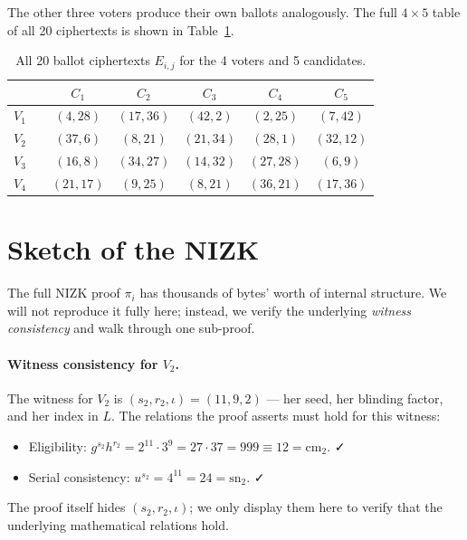 \documentclass[12pt,a4paper,oneside]{report}
\begin{document}
The other three voters produce their own ballots analogously. The full 
$4 \times 5$ table of all 20 ciphertexts is shown in 
Table~\ref{tab:byhand-all-ciphertexts}.

\begin{table}[H]
\centering
\caption{All 20 ballot ciphertexts $E_{i, j}$ for the 4 voters and 5 candidates.}
\label{tab:byhand-all-ciphertexts}
\small
\begin{tabular}{ccccccc}
\toprule
& & $C_1$ & $C_2$ & $C_3$ & $C_4$ & $C_5$ \\
\midrule
$V_1$ & & $(4, 28)$ & $(17, 36)$ & $(42, 2)$ & $(2, 25)$ & $(7, 42)$ \\
$V_2$ & & $(37, 6)$ & $(8, 21)$ & $(21, 34)$ & $(28, 1)$ & $(32, 12)$ \\
$V_3$ & & $(16, 8)$ & $(34, 27)$ & $(14, 32)$ & $(27, 28)$ & $(6, 9)$ \\
$V_4$ & & $(21, 17)$ & $(9, 25)$ & $(8, 21)$ & $(36, 21)$ & $(17, 36)$ \\
\bottomrule
\end{tabular}
\end{table}

\section{Sketch of the NIZK}
\label{sec:byhand-nizk}

The full NIZK proof $\pi_i$ has thousands of bytes' worth of internal 
structure. We will not reproduce it fully here; instead, we verify the 
underlying \textit{witness consistency} and walk through one sub-proof.

\paragraph{Witness consistency for $V_2$.} 
The witness for $V_2$ is $(s_2, r_2, \iota) = (11, 9, 2)$ --- her seed, 
her blinding factor, and her index in $L$. The relations the proof asserts 
must hold for this witness:
\begin{itemize}
    \item Eligibility: $g^{s_2} h^{r_2} = 2^{11} \cdot 3^9 = 27 \cdot 37 
    = 999 \equiv 12 = \text{cm}_2$. ✓
    \item Serial consistency: $u^{s_2} = 4^{11} = 24 = \text{sn}_2$. ✓
\end{itemize}
The proof itself hides $(s_2, r_2, \iota)$; we only display them here to 
verify that the underlying mathematical relations hold.
\end{document}
